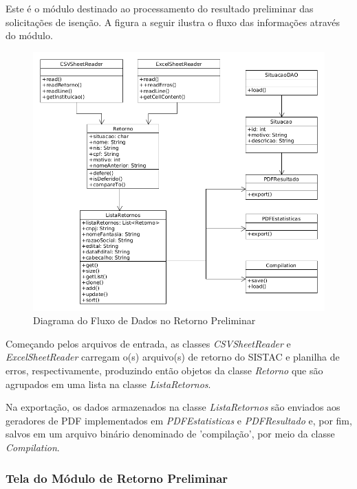 \documentclass[
	12pt,			%
	openright,		%
	oneside,	
	a4paper,		%
	english,		%
	brazil			%
]{abntex2/abntex2}  %
\begin{document}
					Este é o módulo destinado ao processamento do resultado preliminar das solicitações de isenção. A figura a seguir ilustra o fluxo das informações através do módulo.
	
					\clearpage
					\begin{figure}[ht]
						\begin{center}
							
							\caption{Diagrama do Fluxo de Dados no Retorno Preliminar}
							\includegraphics[scale=0.5]{img/retorno-prelim-uml}
							
						\end{center}
					\end{figure}
	
					Começando pelos arquivos de entrada, as classes \textit{CSVSheetReader} e \textit{ExcelSheetReader} carregam o(s) arquivo(s) de retorno do SISTAC e planilha de erros, respectivamente, produzindo então objetos da classe \textit{Retorno} que são agrupados em uma lista na classe \textit{ListaRetornos}.
	
					Na exportação, os dados armazenados na classe \textit{ListaRetornos} são enviados aos geradores de PDF implementados em \textit{PDFEstatisticas} e \textit{PDFResultado} e, por fim, salvos em um arquivo binário denominado de 'compilação', por meio da classe \textit{Compilation}.
	
				\subsubsection{Tela do Módulo de Retorno Preliminar}
	
\end{document}
